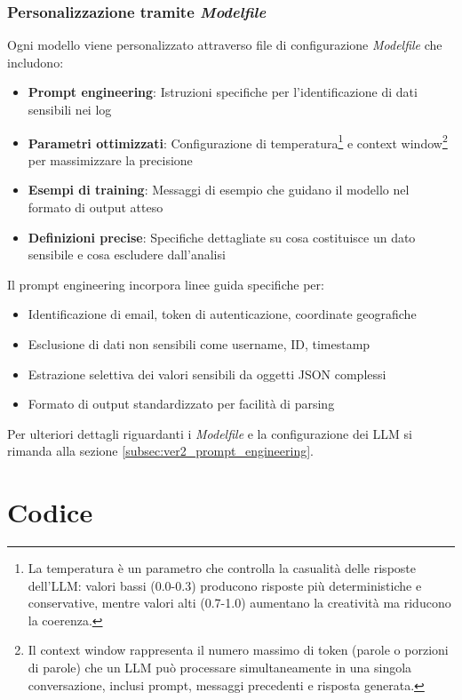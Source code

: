 \documentclass[12pt]{report}
\begin{document}
\subsubsection{Personalizzazione tramite \textit{Modelfile}}
Ogni modello viene personalizzato attraverso file di configurazione \textit{Modelfile} che includono:

\begin{itemize}
    \item \textbf{Prompt engineering}: Istruzioni specifiche per l'identificazione di dati sensibili nei log
    \item \textbf{Parametri ottimizzati}: Configurazione di temperatura\footnote{La temperatura è un parametro che controlla la casualità delle risposte dell'LLM: valori bassi (0.0-0.3) producono risposte più deterministiche e conservative, mentre valori alti (0.7-1.0) aumentano la creatività ma riducono la coerenza.} e context window\footnote{Il context window rappresenta il numero massimo di token (parole o porzioni di parole) che un LLM può processare simultaneamente in una singola conversazione, inclusi prompt, messaggi precedenti e risposta generata.} per massimizzare la precisione
    \item \textbf{Esempi di training}: Messaggi di esempio che guidano il modello nel formato di output atteso
    \item \textbf{Definizioni precise}: Specifiche dettagliate su cosa costituisce un dato sensibile e cosa escludere dall'analisi
\end{itemize}

Il prompt engineering incorpora linee guida specifiche per:
\begin{itemize}
    \item Identificazione di email, token di autenticazione, coordinate geografiche
    \item Esclusione di dati non sensibili come username, ID, timestamp
    \item Estrazione selettiva dei valori sensibili da oggetti JSON complessi
    \item Formato di output standardizzato per facilità di parsing
\end{itemize}

Per ulteriori dettagli riguardanti i \textit{Modelfile} e la configurazione dei LLM si rimanda alla sezione \ref{subsec:ver2_prompt_engineering}.


\section{Codice}
\label{sec:codice}
\end{document}
